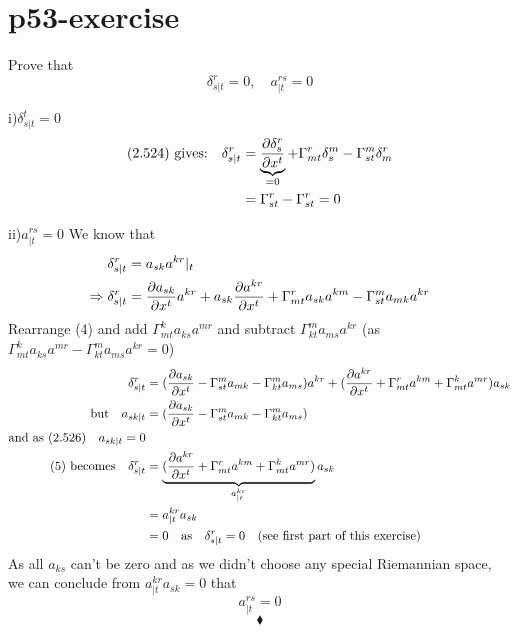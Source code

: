 \section{p53-exercise}
\begin{tcolorbox}
Prove that $$\delta^r_{s|t} = 0, \quad a^{rs}_{|t} = 0$$
\end{tcolorbox}

i)$\delta^t_{s|t} = 0$
\begin{align}
\text{(2.524) gives:}\quad \delta^r_{s|t} &= \underbrace{\pdv{\delta^r_{s}}{x^t}}_\text{=0} + \Gamma^r_{mt}\delta^m_{s}- \Gamma^m_{st}\delta^r_{m}\\
&= \Gamma^r_{st}- \Gamma^r_{st} = 0
\end{align}

ii)$ a^{rs}_{|t} = 0$
We know that 
\begin{align}
\delta^r_{s|t} &= a_{sk}a^{kr}|_{t}\\
\Rightarrow \delta^r_{s|t} &= \pdv{a_{sk}}{x^t}a^{kr}+ a_{sk}\pdv{a^{kr} }{x^t} + \Gamma^r_{mt}a_{sk}a^{km}- \Gamma^m_{st}a_{mk}a^{kr}
\end{align}
Rearrange (4) and add $\Gamma^k_{mt}a_{ks}a^{mr}$ and subtract $\Gamma^m_{kt}a_{ms}a^{kr}$ (as $\Gamma^k_{mt}a_{ks}a^{mr} - \Gamma^m_{kt}a_{ms}a^{kr}  =0 $)
\begin{align}
\delta^r_{s|t} &= (\pdv{a_{sk}}{x^t}- \Gamma^m_{st}a_{mk}-\Gamma^m_{kt}a_{ms} )a^{kr}+ (\pdv{a^{kr} }{x^t} + \Gamma^r_{mt}a^{km}+ \Gamma^k_{mt}a^{mr})a_{sk}\\
\text{but} \quad  a_{sk|t} &= (\pdv{a_{sk}}{x^t}- \Gamma^m_{st}a_{mk}-\Gamma^m_{kt}a_{ms})\\
\text{and as (2.526)}\quad a_{sk|t} = 0\\
\text{(5) becomes}\quad \delta^r_{s|t} &= \underbrace{(\pdv{a^{kr} }{x^t} + \Gamma^r_{mt}a^{km}+ \Gamma^k_{mt}a^{mr})}_{\begin{huge}a^{kr}_{|t}\end{huge}}a_{sk}\\
\ &= a^{kr}_{|t}a_{sk}\\
\ &= 0 \quad \text{as}\quad \delta^r_{s|t}=0  \quad \text{(see first  part of this exercise)}
\end{align}
As all $a_{ks}$ can't be zero and as we didn't choose any special Riemannian space, we can conclude from $ a^{kr}_{|t}a_{sk} = 0$ that $$ a^{rs}_{|t} = 0$$ 
$$\blacklozenge$$
\newpage

